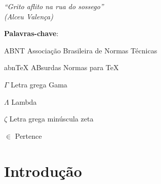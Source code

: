 \documentclass[
	12pt,				%
	openright,			%
	twoside,			%
	a4paper,			%
	english,			%
	french,				%
	spanish,			%
	brazil				%
	]{abntex2}
\begin{document}
\begin{epigrafe}
    \vspace*{\fill}
	\begin{flushright}
		\textit{``Grito aflito na rua do sossego'' \\
		(Alceu Valença)}
	\end{flushright}
\end{epigrafe}


\setlength{\absparsep}{18pt} %
\begin{resumo}
 

 \textbf{Palavras-chave}: 
\end{resumo}


\listoffigures*
\cleardoublepage

\listoftables*
\cleardoublepage

\begin{siglas}
  \item[ABNT] Associação Brasileira de Normas Técnicas
  \item[abnTeX] ABsurdas Normas para TeX
\end{siglas}

\begin{simbolos}
  \item[$ \Gamma $] Letra grega Gama
  \item[$ \Lambda $] Lambda
  \item[$ \zeta $] Letra grega minúscula zeta
  \item[$ \in $] Pertence
\end{simbolos}

\tableofcontents*
\cleardoublepage



\textual

\chapter{Introdução}
\end{document}

